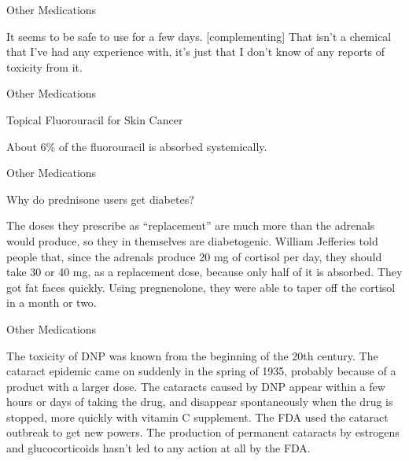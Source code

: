 \documentclass[11pt,oneside,openany,extrafontsizes]{memoir}
\begin{document}
\begin{standalonequote}{Other Medications}

    \begin{answer}
        It seems to be safe to use for a few days. [complementing] That isn't a chemical that I've had any experience with, it's just that I don't know of any reports of toxicity from it.
    \end{answer}
\end{standalonequote}

\begin{standalonequote}{Other Medications}
    \begin{note}
        Topical Fluorouracil for Skin Cancer
    \end{note}

    \begin{answer}
        About 6\% of the fluorouracil is absorbed systemically.
    \end{answer}
\end{standalonequote}

\begin{qaexchange}{Other Medications}

    \begin{question}
        Why do prednisone users get diabetes?
    \end{question}

    \begin{answer}
        The doses they prescribe as \enquote{replacement} are much more than the adrenals would produce, so they in themselves are diabetogenic. William Jefferies told people that, since the adrenals produce 20 mg of cortisol per day, they should take 30 or 40 mg, as a replacement dose, because only half of it is absorbed. They got fat faces quickly. Using pregnenolone, they were able to taper off the cortisol in a month or two.
    \end{answer}
\end{qaexchange}

\begin{standalonequote}{Other Medications}

    \begin{answer}
        The toxicity of DNP was known from the beginning of the 20th century. The cataract epidemic came on suddenly in the spring of 1935, probably because of a product with a larger dose. The cataracts caused by DNP appear within a few hours or days of taking the drug, and disappear spontaneously when the drug is stopped, more quickly with vitamin C supplement. The FDA used the cataract outbreak to get new powers. The production of permanent cataracts by estrogens and glucocorticoids hasn't led to any action at all by the FDA. 
    \end{answer}
\end{standalonequote}
\end{document}
